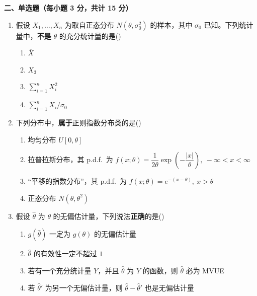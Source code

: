 \documentclass[12pt,a4paper]{ctexart}
\newcommand{\question}[2]{\bigskip\noindent\textbf{#1}\par\nobreak\medskip}
\begin{document}
\question{二、单选题（每小题 3 分，共计 15 分）}{15}
\begin{enumerate}[label=\arabic*.,leftmargin=2.2em]
  \item 假设 $X_{1},\ldots,X_{n}$ 为取自正态分布 $N(\theta,\sigma_{0}^{2})$ 的样本，其中 $\sigma_{0}$ 已知。下列统计量中，\textbf{不是} $\theta$ 的充分统计量的是\hfill(\underline{\hspace{1.2cm}})
  \begin{enumerate}[label=\Alph*.,leftmargin=2.0em]
    \item $\overline{X}$
    \item $X_{3}$
    \item $\sum_{i=1}^{n}X_{i}^{2}$
    \item $\sum_{i=1}^{n}X_{i}/\sigma_{0}$
  \end{enumerate}

  \item 下列分布中，\textbf{属于}正则指数分布类的是\hfill(\underline{\hspace{1.2cm}})
  \begin{enumerate}[label=\Alph*.,leftmargin=2.0em]
    \item 均匀分布 $U[0,\theta]$
    \item 拉普拉斯分布，其 p.d.f.\ 为 $f(x;\theta)=\dfrac{1}{2\theta}\exp\!\left(-\dfrac{|x|}{\theta}\right),\ -\infty<x<\infty$
    \item ``平移的指数分布''，其 p.d.f.\ 为 $f(x;\theta)=e^{-(x-\theta)},\ x>\theta$
    \item 正态分布 $N(\theta,\theta^{2})$
  \end{enumerate}

  \item 假设 $\widehat{\theta}$ 为 $\theta$ 的无偏估计量，下列说法\textbf{正确}的是\hfill(\underline{\hspace{1.2cm}})
  \begin{enumerate}[label=\Alph*.,leftmargin=2.0em]
    \item $g(\widehat{\theta})$ 一定为 $g(\theta)$ 的无偏估计量
    \item $\widehat{\theta}$ 的有效性一定不超过 $1$
    \item 若有一个充分统计量 $Y$，并且 $\widehat{\theta}$ 为 $Y$ 的函数，则 $\widehat{\theta}$ 必为 MVUE
    \item 若 $\widehat{\theta}'$ 为另一个无偏估计量，则 $\widehat{\theta}-\widehat{\theta}'$ 也是无偏估计量
  \end{enumerate}


\end{enumerate}
\end{document}
